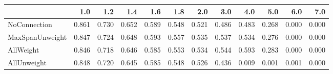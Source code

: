 \begin{tabular}{lrrrrrrrrrrr}
\toprule
{} &   1.0 &   1.2 &   1.4 &   1.6 &   1.8 &   2.0 &   3.0 &   4.0 &   5.0 &   6.0 &   7.0 \\
\midrule
NoConnection    & 0.861 & 0.730 & 0.652 & 0.589 & 0.548 & 0.521 & 0.486 & 0.483 & 0.268 & 0.000 & 0.000 \\
MaxSpanUnweight & 0.847 & 0.724 & 0.648 & 0.593 & 0.557 & 0.535 & 0.537 & 0.534 & 0.276 & 0.000 & 0.000 \\
AllWeight       & 0.846 & 0.718 & 0.646 & 0.585 & 0.553 & 0.534 & 0.544 & 0.593 & 0.283 & 0.000 & 0.000 \\
AllUnweight     & 0.848 & 0.720 & 0.645 & 0.585 & 0.548 & 0.526 & 0.436 & 0.009 & 0.001 & 0.001 & 0.000 \\
\bottomrule
\end{tabular}
